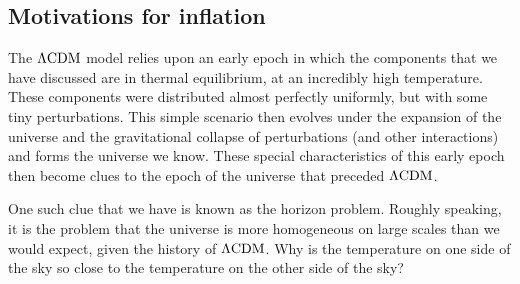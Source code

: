     \subsection{Motivations for inflation}
    The $\Lambda\text{CDM}$ model relies upon an early epoch in which the components that
    we have discussed are in thermal equilibrium,
    at an incredibly high temperature.
    These components were distributed almost perfectly uniformly, but with some tiny perturbations.
    This simple scenario then evolves under the expansion of the universe
    and the gravitational collapse of perturbations (and other interactions) and forms the universe we know.
    These special characteristics of this early epoch
    then become clues to the epoch of the universe that preceded $\Lambda\text{CDM}$.


    One such clue that we have is known as the horizon problem.
    Roughly speaking, it is the problem that the universe is more homogeneous on
    large scales than we would expect, given the history of $\Lambda\text{CDM}$. Why is the temperature on one
    side of the sky so close to the temperature on the other side of the sky?


